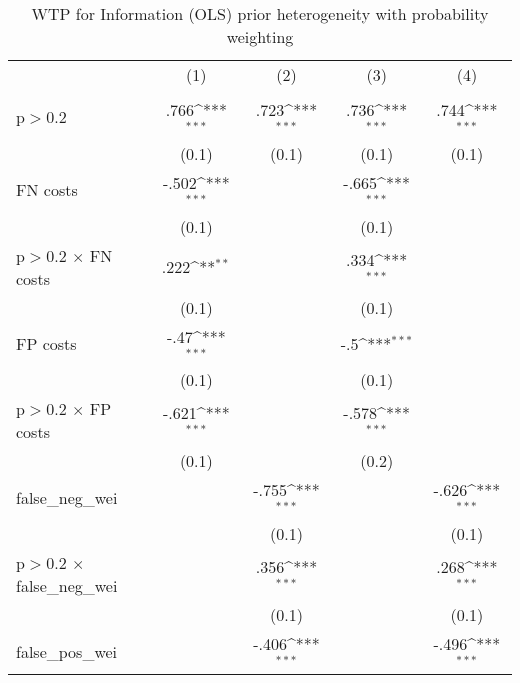 \begin{table}[htbp]\centering
\def\sym#1{\ifmmode^{#1}\else\(^{#1}\)\fi}
\caption{WTP for Information (OLS) prior heterogeneity with probability weighting}
\begin{tabular}{l*{4}{c}}
\hline\hline
                &\multicolumn{1}{c}{(1)}&\multicolumn{1}{c}{(2)}&\multicolumn{1}{c}{(3)}&\multicolumn{1}{c}{(4)}\\
                &\multicolumn{1}{c}{}&\multicolumn{1}{c}{}&\multicolumn{1}{c}{}&\multicolumn{1}{c}{}\\
\hline
p$>$0.2         &     .766\sym{***}&     .723\sym{***}&     .736\sym{***}&     .744\sym{***}\\
                &    (0.1)         &    (0.1)         &    (0.1)         &    (0.1)         \\
FN costs        &    -.502\sym{***}&                  &    -.665\sym{***}&                  \\
                &    (0.1)         &                  &    (0.1)         &                  \\
p$>$0.2 $\times$ FN costs&     .222\sym{**} &                  &     .334\sym{***}&                  \\
                &    (0.1)         &                  &    (0.1)         &                  \\
FP costs        &     -.47\sym{***}&                  &      -.5\sym{***}&                  \\
                &    (0.1)         &                  &    (0.1)         &                  \\
p$>$0.2 $\times$ FP costs&    -.621\sym{***}&                  &    -.578\sym{***}&                  \\
                &    (0.1)         &                  &    (0.2)         &                  \\
false\_neg\_wei   &                  &    -.755\sym{***}&                  &    -.626\sym{***}\\
                &                  &    (0.1)         &                  &    (0.1)         \\
p$>$0.2 $\times$ false\_neg\_wei&                  &     .356\sym{***}&                  &     .268\sym{***}\\
                &                  &    (0.1)         &                  &    (0.1)         \\
false\_pos\_wei   &                  &    -.406\sym{***}&                  &    -.496\sym{***}\\

\end{tabular}
\end{table}
